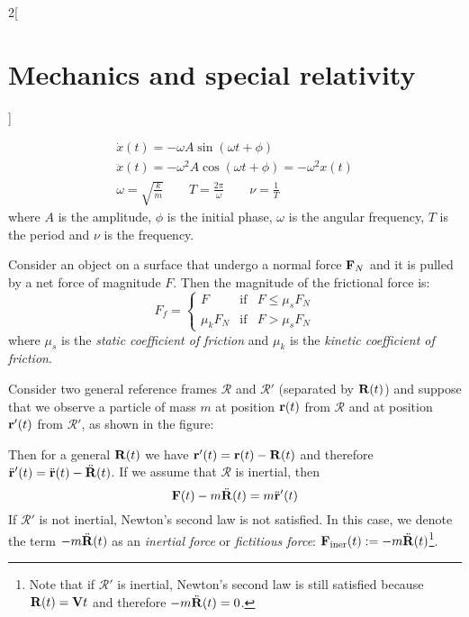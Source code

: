 \documentclass[../../../main.tex]{subfiles}
\begin{document}
\begin{multicols}{2}[\section{Mechanics and special relativity}]
\begin{prop}
\begin{gather*}
      \dot{x}(t)=-\omega A\sin(\omega t+\phi)\\
      \ddot{x}(t)=-\omega^2 A\cos(\omega t+\phi)=-\omega^2x(t)\\
      \omega=\sqrt{\frac{k}{m}}\qquad T=\frac{2\pi}{\omega}\qquad\nu=\frac{1}{T}
    \end{gather*}
    where $A$ is the amplitude, $\phi$ is the initial phase, $\omega$ is the angular frequency, $T$ is the period and $\nu$ is the frequency.
  \end{prop}
  \begin{prop}
    Consider an object on a surface that undergo a normal force $\boldsymbol{\mathrm{F}}_N$ and it is pulled by a net force of magnitude $F$. Then the magnitude of the frictional force is:
    $$
      F_f=\left\{
      \begin{array}{rcl}
        F        & \text{if} & F\leq\mu_sF_N \\
        \mu_kF_N & \text{if} & F>\mu_sF_N
      \end{array}\right.
    $$
    where $\mu_s$ is the \textit{static coefficient of friction} and $\mu_k$ is the \textit{kinetic coefficient of friction}.
  \end{prop}
  \begin{prop}
    Consider two general reference frames $\mathcal{R}$ and $\mathcal{R}'$ (separated by $\boldsymbol{\mathrm{R}}(t)$) and suppose that we observe a particle of mass $m$ at position $\boldsymbol{\mathrm{r}}(t)$ from $\mathcal{R}$ and at position $\boldsymbol{\mathrm{r}}'(t)$ from $\mathcal{R}'$, as shown in the figure:
    \begin{center}
      \begin{minipage}{\linewidth}
        \centering
        
      \end{minipage}
    \end{center}
    Then for a general $\boldsymbol{\mathrm{R}}(t)$ we have $\boldsymbol{\mathrm{r}}'(t)=\boldsymbol{\mathrm{r}}(t)-\boldsymbol{\mathrm{R}}(t)$ and therefore $\ddot{\boldsymbol{\mathrm{r}}}'(t)=\ddot{\boldsymbol{\mathrm{r}}}(t)-\ddot{\boldsymbol{\mathrm{R}}}(t)$. If we assume that $\mathcal{R}$ is inertial, then $$\boldsymbol{\mathrm{F}}(t)-m\ddot{\boldsymbol{\mathrm{R}}}(t)=m\ddot{\boldsymbol{\mathrm{r}}}'(t)$$ If $\mathcal{R}'$ is not inertial, Newton's second law is not satisfied. In this case, we denote the term $-m\ddot{\boldsymbol{\mathrm{R}}}(t)$ as an \textit{inertial force} or \textit{fictitious force}: $\boldsymbol{\mathrm{F}}_\text{iner}(t):=-m\ddot{\boldsymbol{\mathrm{R}}}(t)$\footnote{Note that if $\mathcal{R}'$ is inertial, Newton's second law is still satisfied because $\boldsymbol{\mathrm{R}}(t)=\boldsymbol{\mathrm{V}}t$ and therefore $-m\ddot{\boldsymbol{\mathrm{R}}}(t)=0$.}.
  \end{prop}

\end{multicols}
\end{document}
